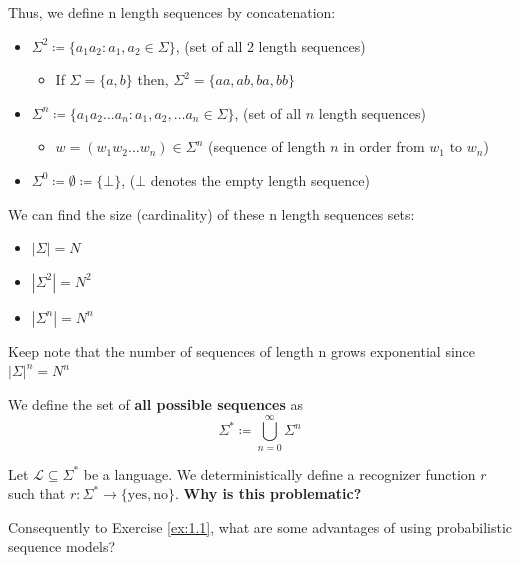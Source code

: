 \documentclass[12pt, twoside]{article}
\begin{document}
Thus, we define n length sequences by concatenation:
\begin{itemize}
    \item $\Sigma^2 \coloneqq \{a_1a_2:a_1,a_2 \in \Sigma\}$, (set of all 2 length sequences)
    \begin{itemize}[label=$\circ$]
        \item If $\Sigma=\{a,b\}$ then, $\Sigma^2=\{aa,ab,ba,bb\}$
    \end{itemize}
    \item $\Sigma^n\coloneqq \{a_1a_2\dots a_n:a_1,a_2,\dots a_n \in \Sigma\} $, (set of all $n$ length sequences)
    \begin{itemize}
        \item $w = (w_1w_2\dots w_n)\in\Sigma^n$ (sequence of length $n$ in order from $w_1 \text{ to } w_n$)
    \end{itemize}
    \item $\Sigma^0 \coloneqq \emptyset \coloneqq \{\bot\}$, ($\bot$ denotes the empty length sequence)
\end{itemize}

We can find the size (cardinality) of these n length sequences sets:
\begin{itemize}
    \item $|\Sigma| = N$
    \item $|\Sigma^2| = N^2$
    \item $|\Sigma^n| = N^n$
\end{itemize}

\begin{remark}
    Keep note that the number of sequences of length n grows exponential since $|\Sigma|^n=N^n$
\end{remark}

\begin{definition}
    We define the set of \textbf{all possible sequences} as
    \[\Sigma^* \coloneqq \bigcup_{n=0}^{\infty} \Sigma^n \]
\end{definition}

\begin{exercise} \label{ex:1.1}
     Let $\mathcal{L} \subseteq \Sigma^*$ be a language. We deterministically define a recognizer function $r$ such that  $r: \Sigma^* \to \{ \text{yes}, \text{no} \}$. \textbf{Why is this problematic?}
\end{exercise}

\begin{exercise} \label{ex:1.2}
    Consequently to Exercise \ref{ex:1.1}, what are some advantages of using probabilistic sequence models?
\end{exercise}
\end{document}
